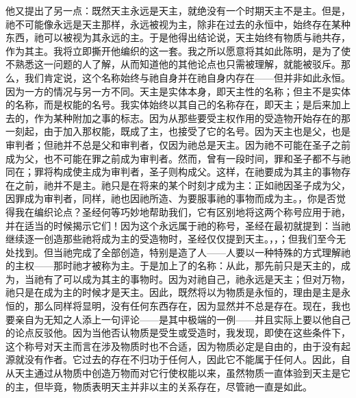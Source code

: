 他又提出了另一点：既然天主永远是天主，就绝没有一个时期天主不是主。但是，祂不可能像永远是天主那样，永远被视为主，除非在过去的永恒中，始终存在某种东西，祂可以被视为其永远的主。于是他得出结论说，天主始终有物质与祂共存，作为其主。我将立即撕开他编织的这一套。我之所以愿意将其如此陈明，是为了使不熟悉这一问题的人了解，从而知道他的其他论点也只需被理解，就能被驳斥。那么，我们肯定说，这个名称始终与祂自身并在祂自身内存在——但并非如此永恒。因为一方的情况与另一方不同。天主是实体本身，即天主性的名称；但主不是实体的名称，而是权能的名号。我实体始终以其自己的名称存在，即天主；是后来加上去的，作为某种附加之事的标志。因为从那些要受主权作用的受造物开始存在的那一刻起，由于加入那权能，既成了主，也接受了它的名号。因为天主也是父，也是审判者；但祂并不总是父和审判者，仅因为祂总是天主。因为祂不可能在圣子之前成为父，也不可能在罪之前成为审判者。然而，曾有一段时间，罪和圣子都不与祂同在；罪将构成使主成为审判者，圣子则构成父。这样，在祂要成为其主的事物存在之前，祂并不是主。祂只是在将来的某个时刻才成为主：正如祂因圣子成为父，因罪成为审判者，同样，祂也因祂所造、为要服事祂的事物而成为主。，你是否觉得我在编织论点？圣经何等巧妙地帮助我们，它有区别地将这两个称号应用于祂，并在适当的时候揭示它们！因为这个永远属于祂的称号，圣经在最初就提到：当祂继续逐一创造那些祂将成为主的受造物时，圣经仅仅提到天主。，，；但我们至今无处找到。但当祂完成了全部创造，特别是造了人——人要以一种特殊的方式理解祂的主权——那时祂才被称为主。于是加上了的名称：从此，那先前只是天主的，成为，当祂有了可以成为其主的事物时。因为对祂自己，祂永远是天主；但对万物，祂只是在成为主的时候才是天主。因此，既然将以为物质是永恒的，理由是主是永恒的，那么同样将显明，没有任何东西存在，因为显然并不总是存在。现在，我也要亲自为无知之人添上一句评论——是其中极端的一例——并且实际上要以他自己的论点反驳他。因为当他否认物质是受生或受造时，我发现，即使在这些条件下，这个称号对天主而言在涉及物质时也不合适，因为物质必定是自由的，由于没有起源就没有作者。它过去的存在不归功于任何人，因此它不能属于任何人。因此，自从天主通过从物质中创造万物而对它行使权能以来，虽然物质一直体验到天主是它的主，但毕竟，物质表明天主并非以主的关系存在，尽管祂一直是如此。\par


